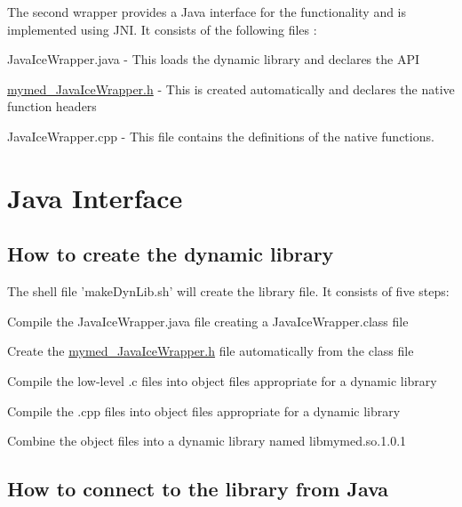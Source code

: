 The second wrapper provides a Java interface for the functionality and is implemented using JNI. It consists of the following files :
\begin{DoxyItemize}
\item JavaIceWrapper.java -\/ This loads the dynamic library and declares the API
\item \hyperlink{mymed__JavaIceWrapper_8h_source}{mymed\_\-JavaIceWrapper.h} -\/ This is created automatically and declares the native function headers
\item JavaIceWrapper.cpp -\/ This file contains the definitions of the native functions.
\end{DoxyItemize}\hypertarget{index_javaint}{}\section{Java Interface}\label{index_javaint}
\hypertarget{index_create}{}\subsection{How to create the dynamic library}\label{index_create}
The shell file 'makeDynLib.sh' will create the library file. It consists of five steps:
\begin{DoxyEnumerate}
\item Compile the JavaIceWrapper.java file creating a JavaIceWrapper.class file
\item Create the \hyperlink{mymed__JavaIceWrapper_8h_source}{mymed\_\-JavaIceWrapper.h} file automatically from the class file
\item Compile the low-\/level .c files into object files appropriate for a dynamic library
\item Compile the .cpp files into object files appropriate for a dynamic library
\item Combine the object files into a dynamic library named libmymed.so.1.0.1
\end{DoxyEnumerate}\hypertarget{index_connect}{}\subsection{How to connect to the library from Java}\label{index_connect}

